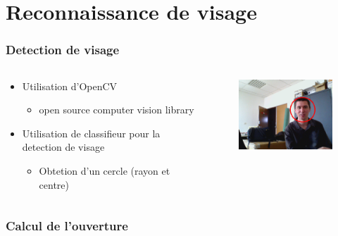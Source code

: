 \section{Reconnaissance de visage}
\begin{frame}
  \frametitle{Detection de visage}
  \begin{columns}[c]
    \begin{column}[T]{.5\textwidth}
      \begin{itemize}
        \item Utilisation d'OpenCV
          \begin{itemize}
            \item open source computer vision library
          \end{itemize}
        \item Utilisation de classifieur pour la detection de visage
          \begin{itemize}
            \item Obtetion d'un cercle (rayon et centre)
          \end{itemize}
      \end{itemize}
    \end{column}
    \begin{column}[T]{.5\textwidth}
      \begin{figure}
        \begin{center}
          \includegraphics[width=5cm]{image/faceDetection.png}
        \end{center}
      \end{figure}
    \end{column}
  \end{columns}   
\end{frame}

\begin{frame}
  \frametitle{Calcul de l'ouverture}
  \begin{figure}
    \begin{columns}[c]
      \begin{column}[T]{.5\textwidth}
        
      \end{column}
      \begin{column}[T]{.5\textwidth}
        
      \end{column}
    \end{columns}   
  \end{figure}
\end{frame}
